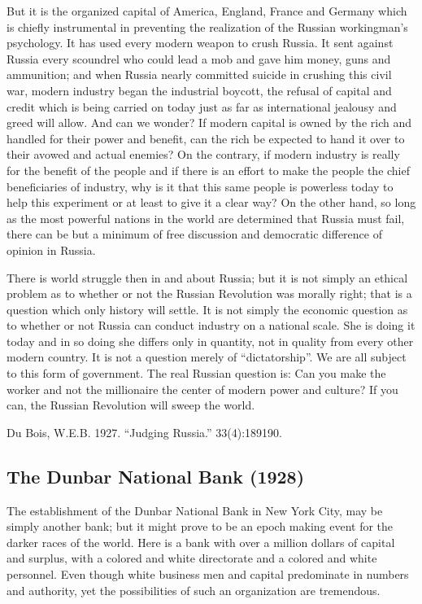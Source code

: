 \documentclass[letterpaper,10pt,english]{jupyterBook}
\begin{document}
\sphinxAtStartPar
But it is the organized capital of America, England, France and Germany which is chiefly instrumental in preventing the realization of the Russian workingman’s psychology. It has used every modern weapon to crush Russia. It sent against Russia every scoundrel who could lead a mob and gave him money, guns and ammunition; and when Russia nearly committed suicide in crushing this civil war, modern industry began the industrial boycott, the refusal of capital and credit which is being carried on today just as far as international jealousy and greed will allow. And can we wonder? If modern capital is owned by the rich and handled for their power and benefit, can the rich be expected to hand it over to their avowed and actual enemies? On the contrary, if modern industry is really for the benefit of the people and if there is an effort to make the people the chief beneficiaries of industry, why is it that this same people is powerless today to help this experiment or at least to give it a clear way? On the other hand, so long as the most powerful nations in the world are determined that Russia must fail, there can be but a minimum of free discussion and democratic difference of opinion in Russia.

\sphinxAtStartPar
There is world struggle then in and about Russia; but it is not simply an ethical problem as to whether or not the Russian Revolution was morally right; that is a question which only history will settle. It is not simply the economic question as to whether or not Russia can conduct industry on a national scale. She is doing it today and in so doing she differs only in quantity, not in quality from every other modern country. It is not a question merely of “dictatorship”. We are all subject to this form of government. The real Russian question is: Can you make the worker and not the millionaire the center of modern power and culture? If you can, the Russian Revolution will sweep the world.

\sphinxAtStartPar
{} Du Bois, W.E.B. 1927. “Judging Russia.”  33(4):189\sphinxhyphen{}190.


\subsection{The Dunbar National Bank (1928)}
\label{\detokenize{Volumes/35/11/dunbar_national_bank:the-dunbar-national-bank-1928}}\label{\detokenize{Volumes/35/11/dunbar_national_bank::doc}}
\sphinxAtStartPar
The establishment of the Dunbar National Bank in New York City, may be simply another bank; but it might prove to be an epoch making event for the darker races of the world. Here is a bank with over a million dollars of capital and surplus, with a colored and white directorate and a colored and white personnel. Even though white business men and capital predominate in numbers and authority, yet the possibilities of such an organization are tremendous.
\end{document}
